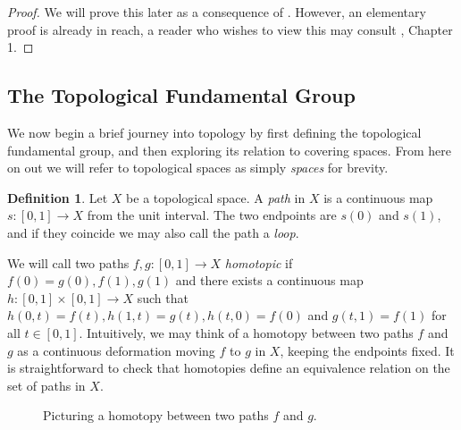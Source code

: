 \documentclass{article}
\theoremstyle{definition}
\newtheorem{definition}[theorem]{Definition}
\theoremstyle{remark}
\theoremstyle{plain}
\begin{document}
\begin{proof}
	We will prove this later as a consequence of . 
	However, an elementary proof is already in reach, a reader who wishes to view this may consult \cite{Szamuely}, Chapter 1.
\end{proof}

\subsection{The Topological Fundamental Group}
We now begin a brief journey into topology by first defining the topological fundamental group, and then exploring its relation to covering spaces.
From here on out we will refer to topological spaces as simply \textit{spaces} for brevity.


\begin{definition}
	Let $X$ be a topological space. 
	A \textit{path} in $X$ is a continuous map $s: [0,1] \to X$ from the unit interval.
	The two endpoints are $s(0)$ and $s(1)$, and if they coincide we may also call the path a \textit{loop}.
\end{definition}

We will call two paths $f,g: [0,1] \to X$ \textit{homotopic} if $f(0) = g(0), f(1), g(1)$ and there exists a continuous map $h: [0,1] \times [0,1] \to X$ such that $h(0,t) = f(t), h(1,t) = g(t), h(t,0) = f(0)$ and $g(t,1) = f(1)$ for all $t \in [0,1]$.
Intuitively, we may think of a homotopy between two paths $f$ and $g$ as a continuous deformation moving $f$ to $g$ in $X$, keeping the endpoints fixed. 
It is straightforward to check that homotopies define an equivalence relation on the set of paths in $X$.\\

\begin{figure}[!h]
	\centering
{}
\caption{Picturing a homotopy between two paths $f$ and $g$.}
\end{figure}
\end{document}
